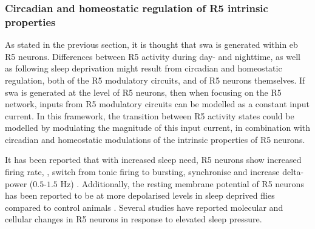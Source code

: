 \documentclass[../main.tex]{subfiles}
\begin{document}
\subsubsection{Circadian and homeostatic regulation of R5 intrinsic properties} \label{subsubsec:circ_and_hemeo_r5}

As stated in the previous section, it is thought that \gls{swa} is generated within \gls{eb} R5 neurons.
Differences between R5 activity during day- and nighttime, as well as following sleep deprivation might result from circadian and homeostatic regulation, both of the R5 modulatory circuits, and of R5 neurons themselves. If \gls{swa} is generated at the level of R5 neurons, then when focusing on the R5 network, inputs from R5 modulatory circuits can be modelled as a constant input current. In this framework, the transition between R5 activity states could be modelled by modulating the magnitude of this input current, in combination with circadian and homeostatic modulations of the intrinsic properties of R5 neurons.

It has been reported that with increased sleep need, R5 neurons show increased firing rate, \cite{raccugliaNetworkSpecificSynchronizationElectrical2019,liuSleepDriveEncoded2016},
switch from tonic firing to bursting, synchronise and increase delta-power ($0.5$-$1.5$ Hz) \cite{raccugliaNetworkSpecificSynchronizationElectrical2019}. Additionally, the resting membrane potential of R5 neurons has been reported to be at more depolarised levels in sleep deprived flies compared to control animals \cite{liuSleepDriveEncoded2016}. Several studies have reported molecular and cellular changes in R5 neurons in response to elevated sleep pressure.
\end{document}
